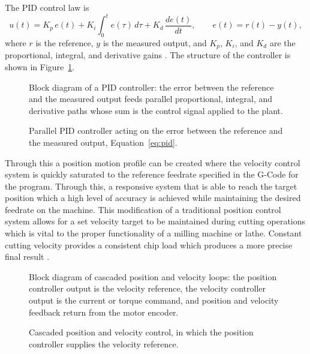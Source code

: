 The PID control law is
\begin{equation}
	u(t) = K_p\, e(t) + K_i \int_{0}^{t} e(\tau)\, d\tau + K_d\, \frac{de(t)}{dt},
	\qquad e(t) = r(t) - y(t),
	\label{eq:pid}
\end{equation}
where $r$ is the reference, $y$ is the measured output, and $K_p$, $K_i$, and $K_d$ are the proportional, integral, and derivative gains \cite{astrom_feedback_2021}. The structure of the controller is shown in Figure~\ref{fig:pid_block}.
\begin{figure}[htbp]
	\centering
		{Block diagram of a PID controller: the error between the reference and the measured output feeds parallel proportional, integral, and derivative paths whose sum is the control signal applied to the plant.}
	\caption[PID controller]{Parallel PID controller acting on the error between the reference and the measured output, Equation~\eqref{eq:pid}.}
	\label{fig:pid_block}
\end{figure}

Through this a position motion profile can be created where the velocity control system is quickly saturated to the reference feedrate specified in the G-Code for the program. Through this, a responsive system that is able to reach the target position which a high level of accuracy is achieved while maintaining the desired feedrate on the machine. This modification of a traditional position control system allows for a set velocity target to be maintained during cutting operations which is vital to the proper functionality of a milling machine or lathe. Constant cutting velocity provides a consistent chip load which produces a more precise final result \cite{altintas_manufacturing_2012}.


\begin{figure}[htbp]
	\centering
		{Block diagram of cascaded position and velocity loops: the position controller output is the velocity reference, the velocity controller output is the current or torque command, and position and velocity feedback return from the motor encoder.}
	\caption[Cascaded position and velocity control]{Cascaded position and velocity control, in which the position controller supplies the velocity reference.}
	\label{fig:cascaded_pid}
\end{figure}

